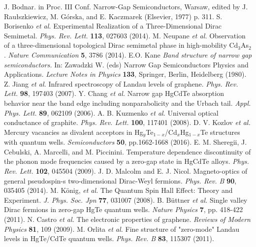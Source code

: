 \documentclass[titlepage,a4paper]{book}
\begin{document}
\begin{thebibliography}{199}
J. Bodnar. in Proc. III Conf. Narrow-Gap Semiconductors, Warsaw, edited by J. Raułszkiewicz, M. Górska, and E. Kaczmarek (Elsevier, 1977) p. 311.
S. Borisenko \textit{et al.} Experimental Realization of a Three-Dimensional Dirac Semimetal. \textit{Phys. Rev. Lett.} \textbf{113}, 027603 (2014).
M. Neupane \textit{et al.} Observation of a three-dimensional topological Dirac semimetal phase in high-mobility Cd$_3$As$_2$. \textit{Nature Communication} \textbf{5}, 3786 (2014).
E.O. Kane \textit{Band structure of narrow gap semiconductors.} In: Zawadzki W. (eds) Narrow Gap Semiconductors Physics and Applications. \textit{Lecture Notes in Physics} \textbf{133}, Springer, Berlin, Heidelberg (1980).
Z. Jiang \textit{et al.} Infrared spectroscopy of Landau levels of graphene. \textit{Phys. Rev. Lett.} \textbf{98}, 197403 (2007).
Y. Chang \textit{et al.} Narrow gap HgCdTe absorption behavior near the band edge including nonparabolicity and the Urbach tail. \textit{Appl. Phys. Lett.} \textbf{89}, 062109 (2006).
A. B. Kuzmenko \textit{et al.} Universal optical conductance of graphite. \textit{Phys. Rev. Lett.} \textbf{100}, 117401 (2008).
D. V. Kozlov \textit{et al.} Mercury vacancies as divalent acceptors in Hg$_y$Te$_{1-x}$/Cd$_x$Hg$_{1-x}$Te structures with quantum wells. \textit{Semiconductors} \textbf{50}, pp.1662-1668 (2016).
E. M. Sheregii, J. Cebulski, A. Marcelli, and M. Piccinini. Temperature dependence discontinuity of the phonon mode frequencies caused by a zero-gap state in HgCdTe alloys. \textit{Phys. Rev. Lett.} \textbf{102}, 045504 (2009). 
J. D. Malcolm and E. J. Nicol. Magneto-optics of general pseudospin-s two-dimensional Dirac-Weyl fermions. \textit{Phys. Rev. B} \textbf{90}, 035405 (2014).
M. König, \textit{et al.} The Quantum Spin Hall Effect: Theory and Experiment. \textit{J. Phys. Soc. Jpn} \textbf{77}, 031007 (2008).
B. Büttner \textit{et al.} Single valley Dirac fermions in zero-gap HgTe quantum wells. \textit{Nature Physics} \textbf{7}, pp. 418-422 (2011).
N. Castro \textit{et al.} The electronic properties of graphene. \textit{Reviews of Modern Physics} \textbf{81}, 109 (2009).
M. Orlita \textit{et al.} Fine structure of "zero-mode" Landau levels in HgTe/CdTe quantum wells. \textit{Phys. Rev. B} \textbf{83}, 115307 (2011).

\end{thebibliography}
\end{document}
